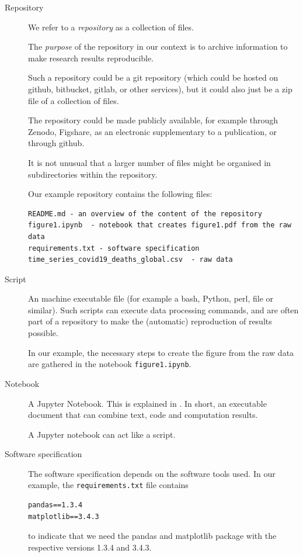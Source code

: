 \begin{description}
\item[Repository] We refer to a \emph{repository} as a collection of files.

The \emph{purpose} of the repository in our context is to archive information to make
research results reproducible.

Such a repository could be a git repository (which could be hosted on github,
bitbucket, gitlab, or other services), but it could also just be a zip file of a
collection of files.

The repository could be made publicly available, for example through Zenodo,
Figshare, as an electronic supplementary to a publication, or through github.

It is not unusual that a larger number of files might be
organised in subdirectories within the repository.

Our example repository \cite{ReproducibilityRepositoryExample2022} contains the following files:

\begin{verbatim}
README.md - an overview of the content of the repository
figure1.ipynb  - notebook that creates figure1.pdf from the raw data
requirements.txt - software specification
time_series_covid19_deaths_global.csv  - raw data
\end{verbatim}

\item[Script] An machine executable file (for example a bash, Python, perl, file
or similar). Such scripts can execute data processing commands, and are often
part of a repository to make the (automatic) reproduction of results possible.

In our example, the necessary steps to create the figure from the raw data are
gathered in the notebook \texttt{figure1.ipynb}. 

\item[Notebook] A Jupyter Notebook. This is explained in . In short, an executable document that can combine text, code
and computation results.

A Jupyter notebook can act like a script.

\item[Software specification] The software specification depends on the software
  tools used. In our example, the \texttt{requirements.txt} file contains
\begin{verbatim}
pandas==1.3.4
matplotlib==3.4.3
\end{verbatim}
to indicate that we need the pandas and matplotlib package with the respective
versions 1.3.4 and 3.4.3.


\end{description}
